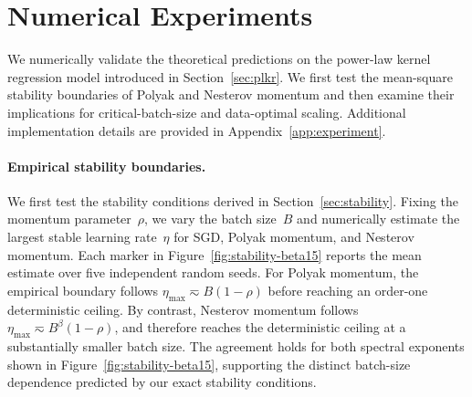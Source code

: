 \documentclass[11pt]{article}
\begin{document}

\section{Numerical Experiments}
\label{sec:experiment}
We numerically validate the theoretical predictions on the power-law kernel
regression model introduced in Section~\ref{sec:plkr}. We first test the
mean-square stability boundaries of Polyak and Nesterov momentum and then
examine their implications for critical-batch-size and data-optimal scaling.
Additional implementation details are provided in
Appendix~\ref{app:experiment}.

\paragraph{Empirical stability boundaries.}
We first test the stability conditions derived in
Section~\ref{sec:stability}. Fixing the momentum parameter~\(\rho\), we vary
the batch size~\(B\) and numerically estimate the largest stable learning
rate~\(\eta\) for SGD, Polyak momentum, and Nesterov momentum. Each marker in
Figure~\ref{fig:stability-beta15} reports the mean estimate over five
independent random seeds. For Polyak momentum, the empirical boundary follows
\(\eta_{\max}\eqsim B(1-\rho)\) before reaching an order-one deterministic
ceiling. By contrast, Nesterov momentum follows
\(\eta_{\max}\eqsim B^\beta(1-\rho)\), and therefore reaches the deterministic
ceiling at a substantially smaller batch size. The agreement holds for both
spectral exponents shown in Figure~\ref{fig:stability-beta15}, supporting
the distinct batch-size dependence predicted by our exact stability
conditions.
\end{document}
